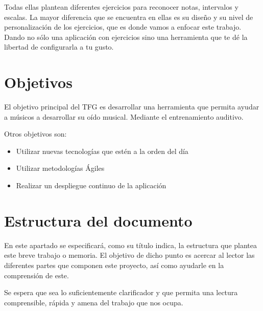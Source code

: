 \documentclass[12pt,twoside,titlepage]{report}
\begin{document}
Todas ellas plantean diferentes ejercicios para reconocer notas, intervalos y escalas. La mayor diferencia que se encuentra en ellas es su diseño y su nivel de personalización de los ejercicios, que es donde vamos a enfocar este trabajo. Dando no sólo una aplicación con ejercicios sino una herramienta que te dé la libertad de configurarla a tu gusto.

\section{Objetivos}

El objetivo principal del TFG es desarrollar una herramienta que permita ayudar a músicos a desarrollar su oído musical. Mediante el entrenamiento auditivo.

Otros objetivos son:
\begin{itemize}
    \item Utilizar nuevas tecnologías que estén a la orden del día
    \item Utilizar metodologías Ágiles
    \item Realizar un despliegue continuo de la aplicación

\end{itemize}

\section{Estructura del documento}

En este apartado se especificará, como su título indica, la estructura que plantea este breve trabajo o memoria. El objetivo de dicho punto es acercar al lector las diferentes partes que componen este proyecto, así como ayudarle en la comprensión de este.

Se espera que sea lo suficientemente clarificador y que permita una lectura comprensible, rápida y amena del trabajo que nos ocupa.
\end{document}
